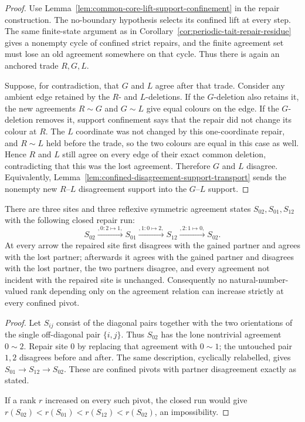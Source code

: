 \begin{proof}
Use Lemma~\ref{lem:common-core-lift-support-confinement} in the repair
construction.  The no-boundary hypothesis selects its confined lift at every
step.  The same finite-state argument as in
Corollary~\ref{cor:periodic-tait-repair-residue} gives a nonempty cycle of
confined strict repairs, and the finite agreement set must lose an old
agreement somewhere on that cycle.  Thus there is again an anchored trade
$R,G,L$.

Suppose, for contradiction, that $G$ and $L$ agree after that trade.  Consider
any ambient edge retained by the $R$- and $L$-deletions.  If the $G$-deletion
also retains it, the new agreements $R\sim G$ and $G\sim L$ give equal
colours on the edge.  If the $G$-deletion removes it, support confinement says
that the repair did not change its colour at $R$.  The $L$ coordinate was not
changed by this one-coordinate repair, and $R\sim L$ held before the trade,
so the two colours are equal in this case as well.  Hence $R$ and $L$ still
agree on every edge of their exact common deletion, contradicting that this
was the lost agreement.  Therefore $G$ and $L$ disagree.
Equivalently, Lemma~\ref{lem:confined-disagreement-support-transport} sends
the nonempty new $R$--$L$ disagreement support into the $G$--$L$ support.
\end{proof}

\begin{proposition}
\label{prop:agreement-pivot-cycle-countermodel}
There are three sites and three reflexive symmetric agreement states
$S_{02},S_{01},S_{12}$ with the following closed repair run:
\[
 S_{02}\xrightarrow{,0:2\mapsto 1,}S_{01}
 \xrightarrow{,1:0\mapsto 2,}S_{12}
 \xrightarrow{,2:1\mapsto 0,}S_{02}.
\]
At every arrow the repaired site first disagrees with the gained partner and
agrees with the lost partner; afterwards it agrees with the gained partner
and disagrees with the lost partner, the two partners disagree, and every
agreement not incident with the repaired site is unchanged.  Consequently
no natural-number-valued rank depending only on the agreement relation can
increase strictly at every confined pivot.
\end{proposition}

\begin{proof}
Let $S_{ij}$ consist of the diagonal pairs together with the two orientations
of the single off-diagonal pair $\{i,j\}$.  Thus $S_{02}$ has the lone
nontrivial agreement $0\sim2$.  Repair site $0$ by replacing that agreement
with $0\sim1$; the untouched pair $1,2$ disagrees before and after.  The same
description, cyclically relabelled, gives
$S_{01}\to S_{12}\to S_{02}$.  These are confined pivots with partner
disagreement exactly as stated.

If a rank $r$ increased on every such pivot, the closed run would give
$r(S_{02})<r(S_{01})<r(S_{12})<r(S_{02})$, an impossibility.
\end{proof}

